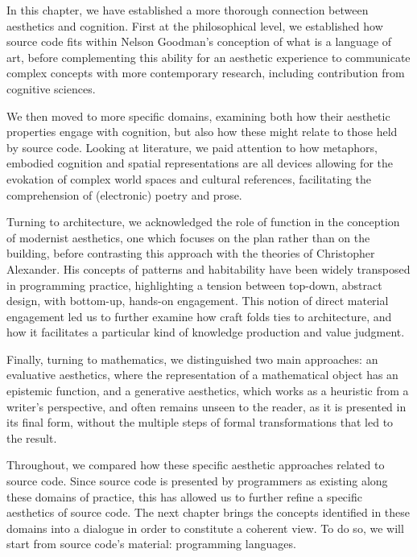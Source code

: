 \spacer

In this chapter, we have established a more thorough connection between aesthetics and cognition. First at the philosophical level, we established how source code fits within Nelson Goodman's conception of what is a language of art, before complementing this ability for an aesthetic experience to communicate complex concepts with more contemporary research, including contribution from cognitive sciences.

We then moved to more specific domains, examining both how their aesthetic properties engage with cognition, but also how these might relate to those held by source code. Looking at literature, we paid attention to how metaphors, embodied cognition and spatial representations are all devices allowing for the evokation of complex world spaces and cultural references, facilitating the comprehension of (electronic) poetry and prose.

Turning to architecture, we acknowledged the role of function in the conception of modernist aesthetics, one which focuses on the plan rather than on the building, before contrasting this approach with the theories of Christopher Alexander. His concepts of patterns and habitability have been widely transposed in programming practice, highlighting a tension between top-down, abstract design, with bottom-up, hands-on engagement. This notion of direct material engagement led us to further examine how craft folds ties to architecture, and how it facilitates a particular kind of knowledge production and value judgment.

Finally, turning to mathematics, we distinguished two main approaches: an evaluative aesthetics, where the representation of a mathematical object has an epistemic function, and a generative aesthetics, which works as a heuristic from a writer's perspective, and often remains unseen to the reader, as it is presented in its final form, without the multiple steps of formal transformations that led to the result.

Throughout, we compared how these specific aesthetic approaches related to source code. Since source code is presented by programmers as existing along these domains of practice, this has allowed us to further refine a specific aesthetics of source code. The next chapter brings the concepts identified in these domains into a dialogue in order to constitute a coherent view. To do so, we will start from source code's material: programming languages.
